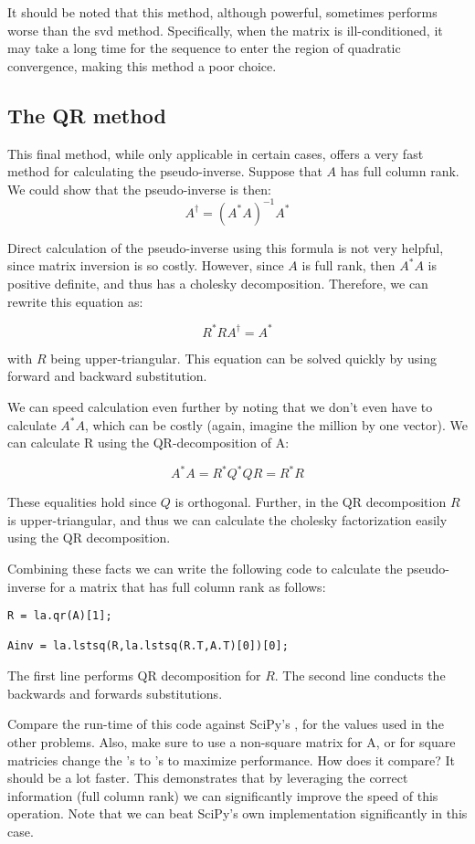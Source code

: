 It should be noted that this method, although powerful, sometimes performs worse than the svd method. Specifically, when the matrix is ill-conditioned, it may take a long time for the sequence to enter the region of quadratic convergence, making this method a poor choice.

\subsection*{The QR method}

This final method, while only applicable in certain cases, offers a very fast method for calculating the pseudo-inverse. Suppose that $A$ has full column rank. We could show that the pseudo-inverse is then:
\[
A^\dagger = (A^* A)^{-1} A^*
\]

Direct calculation of the pseudo-inverse using this formula is not very helpful, since matrix inversion is so costly. However, since $A$ is full rank, then $A^*A$ is positive definite, and thus has a cholesky decomposition. Therefore, we can rewrite this equation as:

\[
R^*R A^\dagger = A^*
\]

with $R$ being upper-triangular. This equation can be solved quickly by using forward and backward substitution.

We can speed calculation even further by noting that we don't even have to calculate $A^* A$, which can be costly (again, imagine the million by one vector). We can calculate R using the QR-decomposition of A:

\[
A^* A = R^*Q^*QR = R^* R
\]

These equalities hold since $Q$ is orthogonal. Further, in the QR decomposition $R$ is upper-triangular, and thus we can calculate the cholesky factorization easily using the QR decomposition.

Combining these facts we can write the following code to calculate the pseudo-inverse for a matrix that has full column rank as follows:

\begin{lstlisting}[style=python]
R = la.qr(A)[1];

Ainv = la.lstsq(R,la.lstsq(R.T,A.T)[0])[0];
\end{lstlisting}


The first line performs QR decomposition for $R$. The second line conducts the backwards and forwards substitutions.

\begin{problem}
Compare the run-time of this code against SciPy's , for the values used in the other problems. Also, make sure to use a non-square matrix for A, or for square matricies change the 's to 's to maximize performance.  How does it compare? It should be a lot faster. This demonstrates that by leveraging the correct information (full column rank) we can significantly improve the speed of this operation. Note that we can beat SciPy's own implementation significantly in this case.

\end{problem}


